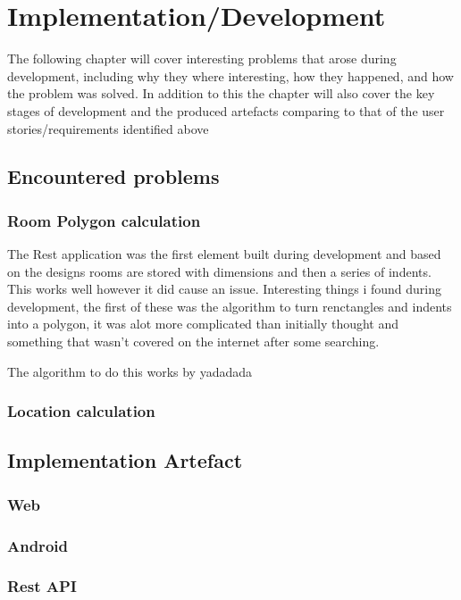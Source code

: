 \section{Implementation/Development}
The following chapter will cover interesting problems that arose during development, including why they where interesting, how they happened, and how the problem was solved. In addition to this the chapter will also cover the key stages of development and the produced artefacts comparing to that of the user stories/requirements identified above

\subsection{Encountered problems} %
\subsubsection{Room Polygon calculation}
The Rest application was the first element built during development and based on the designs rooms are stored with dimensions and then a series of indents. This works well however it did cause an issue.
Interesting things i found during development, the first of these was the algorithm to turn renctangles and indents into a polygon, it was alot more complicated than initially thought and something that wasn't covered on the internet after some searching.

The algorithm to do this works by yadadada

\subsubsection{Location calculation}
\subsection{Implementation Artefact}
\subsubsection{Web}
\subsubsection{Android}
\subsubsection{Rest API}


